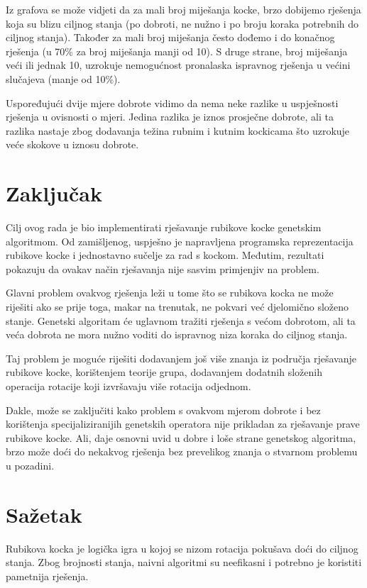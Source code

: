 \documentclass[times, utf8, seminar, numeric]{fer}
\begin{document}
Iz grafova se može vidjeti da za mali broj miješanja kocke, brzo dobijemo rješenja koja su blizu ciljnog stanja (po dobroti, ne nužno i po broju koraka potrebnih do ciljnog stanja). Također za mali broj miješanja često dođemo i do konačnog rješenja (u 70\% za broj miješanja manji od 10). 
S druge strane, broj miješanja veći ili jednak 10, uzrokuje nemogućnost pronalaska ispravnog rješenja u većini slučajeva (manje od 10\%). 

Uspoređujući dvije mjere dobrote vidimo da nema neke razlike u uspješnosti rješenja u ovisnosti o mjeri. Jedina razlika je iznos prosječne dobrote, ali ta razlika nastaje zbog dodavanja težina rubnim i kutnim kockicama što uzrokuje veće skokove u iznosu dobrote.

\chapter{Zaključak}
Cilj ovog rada je bio implementirati rješavanje rubikove kocke genetskim algoritmom. Od zamišljenog, uspješno je napravljena programska reprezentacija rubikove kocke i jednostavno sučelje za rad s kockom. Međutim, rezultati pokazuju da ovakav način rješavanja nije sasvim primjenjiv na problem. 

Glavni problem ovakvog rješenja leži u tome što se rubikova kocka ne može riješiti ako se prije toga, makar na trenutak, ne pokvari već djelomično složeno stanje. Genetski algoritam će uglavnom tražiti rješenja s većom dobrotom, ali ta veća dobrota ne mora nužno voditi do ispravnog niza koraka do ciljnog stanja.

Taj problem je moguće riješiti dodavanjem još više znanja iz područja rješavanje rubikove kocke, korištenjem teorije grupa, dodavanjem dodatnih složenih operacija rotacije koji izvršavaju više rotacija odjednom. 

Dakle, može se zaključiti kako problem s ovakvom mjerom dobrote i bez korištenja specijaliziranijih genetskih operatora nije prikladan za rješavanje prave rubikove kocke. Ali, daje osnovni uvid u dobre i loše strane genetskog algoritma, brzo može doći do nekakvog rješenja bez prevelikog znanja o stvarnom problemu u pozadini.





\chapter{Sažetak}
Rubikova kocka je logička igra u kojoj se nizom rotacija pokušava doći do ciljnog stanja. Zbog brojnosti stanja, naivni algoritmi su neefikasni i potrebno je koristiti pametnija rješenja.
\end{document}

